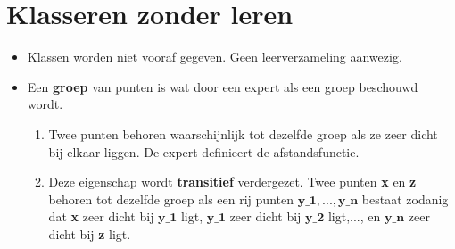 \begin{itemize}
		\end{itemize}

\section{Klasseren zonder leren}
\begin{itemize}
	\item Klassen worden niet vooraf gegeven.
	\alert Geen leerverzameling aanwezig.
	\item Een \textbf{groep} van punten is wat door een expert als een groep beschouwd wordt.
	\begin{enumerate}
		\item Twee punten behoren waarschijnlijk tot dezelfde groep als ze zeer dicht bij elkaar liggen. De expert definieert de afstandsfunctie.
		\item Deze eigenschap wordt \textbf{transitief} verdergezet. Twee punten \textbf{x} en \textbf{z} behoren tot dezelfde groep als een rij punten $\textbf{y_1},...,\textbf{y_n}$ bestaat zodanig dat \textbf{x} zeer dicht bij $\textbf{y_1}$ ligt, $\textbf{y_1}$ zeer dicht bij $\textbf{y_2}$ ligt,..., en $\textbf{y_n}$ zeer dicht bij \textbf{z} ligt. 
	\end{enumerate}
\end{itemize}
